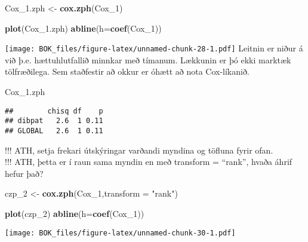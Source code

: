 \documentclass[
]{book}
\newenvironment{Shaded}{\begin{snugshade}}{\end{snugshade}}
\newcommand{\DataTypeTok}[1]{\textcolor[rgb]{0.13,0.29,0.53}{#1}}
\newcommand{\DecValTok}[1]{\textcolor[rgb]{0.00,0.00,0.81}{#1}}
\newcommand{\FloatTok}[1]{\textcolor[rgb]{0.00,0.00,0.81}{#1}}
\newcommand{\KeywordTok}[1]{\textcolor[rgb]{0.13,0.29,0.53}{\textbf{#1}}}
\newcommand{\NormalTok}[1]{#1}
\newcommand{\StringTok}[1]{\textcolor[rgb]{0.31,0.60,0.02}{#1}}
\begin{document}
\begin{Shaded}
\begin{Highlighting}[]
\NormalTok{Cox\_}\FloatTok{1.}\NormalTok{zph <{-}}\StringTok{ }\KeywordTok{cox.zph}\NormalTok{(Cox\_}\DecValTok{1}\NormalTok{)}
\end{Highlighting}
\end{Shaded}

\begin{Shaded}
\begin{Highlighting}[]
\KeywordTok{plot}\NormalTok{(Cox\_}\FloatTok{1.}\NormalTok{zph)}
\KeywordTok{abline}\NormalTok{(}\DataTypeTok{h=}\KeywordTok{coef}\NormalTok{(Cox\_}\DecValTok{1}\NormalTok{))}
\end{Highlighting}
\end{Shaded}

\texttt{[image: BOK\_files/figure-latex/unnamed-chunk-28-1.pdf]}
Leitnin er niður á við þ.e. hættuhlutfallið minnkar með tímanum. Lækkunin er þó ekki marktæk tölfræðilega. Sem staðfestir að okkur er óhætt að nota Cox-líkanið.

\begin{Shaded}
\begin{Highlighting}[]
\NormalTok{Cox\_}\FloatTok{1.}\NormalTok{zph}
\end{Highlighting}
\end{Shaded}

\begin{verbatim}
##        chisq df    p
## dibpat   2.6  1 0.11
## GLOBAL   2.6  1 0.11
\end{verbatim}

!!! ATH, setja frekari útskýringar varðandi myndina og töfluna fyrir ofan.\\
!!! ATH, þetta er í raun sama myndin en með transform = ``rank'', hvaða áhrif hefur það?

\begin{Shaded}
\begin{Highlighting}[]
\NormalTok{czp\_}\DecValTok{2}\NormalTok{ <{-}}\StringTok{ }\KeywordTok{cox.zph}\NormalTok{(Cox\_}\DecValTok{1}\NormalTok{,}\DataTypeTok{transform =} \StringTok{"rank"}\NormalTok{)}

\KeywordTok{plot}\NormalTok{(czp\_}\DecValTok{2}\NormalTok{)}
\KeywordTok{abline}\NormalTok{(}\DataTypeTok{h=}\KeywordTok{coef}\NormalTok{(Cox\_}\DecValTok{1}\NormalTok{))}
\end{Highlighting}
\end{Shaded}

\texttt{[image: BOK\_files/figure-latex/unnamed-chunk-30-1.pdf]}
\end{document}
